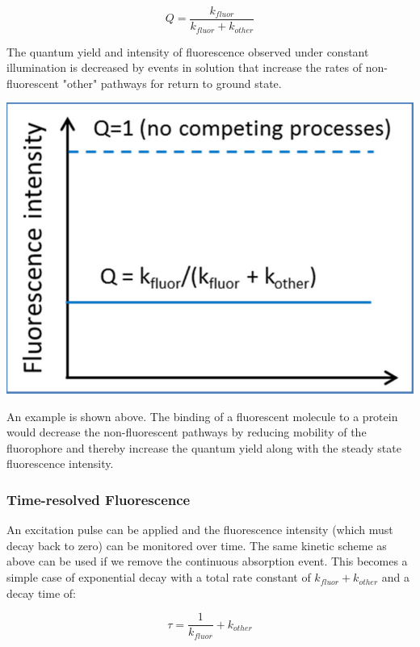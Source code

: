 \documentclass[12pt, letterpaper]{article}
\begin{document}
 \begin{equation*}
    Q = \frac{k_{fluor}}{k_{fluor} + k_{other}}
 \end{equation*}

 The quantum yield and intensity of fluorescence observed under constant illumination is decreased by events in solution that increase the rates of non-fluorescent "other" pathways
 for return to ground state. 

 \begin{center}
    \includegraphics{quantum.png}
 \end{center}

 An example is shown above. The binding of a fluorescent molecule to a protein would decrease the non-fluorescent pathways by reducing mobility of the fluorophore and thereby increase the 
 quantum yield along with the steady state fluorescence intensity. 

 \subsubsection*{Time-resolved Fluorescence}
 An excitation pulse can be applied and the fluorescence intensity (which must decay back to zero) can be monitored over time. The same kinetic scheme as above can be used if 
 we remove the continuous absorption event. This becomes a simple case of exponential decay with a total rate constant of $k_{fluor} + k_{other}$ and a decay time of: 

 \begin{equation*}
    \tau = \frac{1}{k_{fluor}}+ k_{other}
 \end{equation*}
\end{document}
